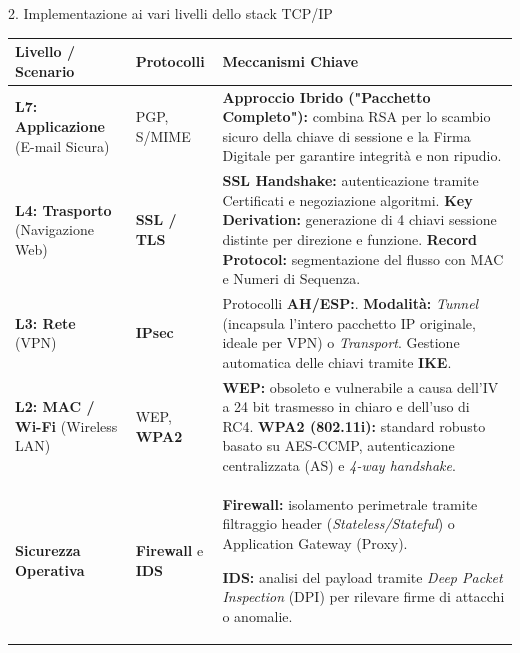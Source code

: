 \documentclass[a4paper,12pt]{report}
\renewcommand{\arraystretch}{1.2} %
\begin{document}
{\begin{notebox}{2. Implementazione ai vari livelli dello stack TCP/IP}
\vspace{0.2cm}
\renewcommand{\arraystretch}{1.4}
\small
\begin{tabularx}{\textwidth}{|l|l|X|}
\toprule
\textbf{Livello / Scenario} & \textbf{Protocolli} & \textbf{Meccanismi Chiave} \\
\midrule
\textbf{L7: Applicazione} \newline (E-mail Sicura) & PGP, \newline S/MIME & \textbf{Approccio Ibrido ("Pacchetto Completo"):} combina RSA per lo scambio sicuro della chiave di sessione e la Firma Digitale per garantire integrità e non ripudio. \\
\hline
\textbf{L4: Trasporto} \newline (Navigazione Web) & \textbf{SSL / TLS} & \textbf{SSL Handshake:} autenticazione tramite Certificati e negoziazione algoritmi. \textbf{Key Derivation:} generazione di 4 chiavi sessione distinte per direzione e funzione. \textbf{Record Protocol:} segmentazione del flusso con MAC e Numeri di Sequenza. \\
\hline
\textbf{L3: Rete} \newline (VPN) & \textbf{IPsec} & Protocolli \textbf{AH/ESP:}. \textbf{Modalità:} \textit{Tunnel} (incapsula l'intero pacchetto IP originale, ideale per VPN) o \textit{Transport}. Gestione automatica delle chiavi tramite \textbf{IKE}. \\
\hline
\textbf{L2: MAC / Wi-Fi} \newline (Wireless LAN) & WEP, \newline \textbf{WPA2} & \textbf{WEP:} obsoleto e vulnerabile a causa dell'IV a 24 bit trasmesso in chiaro e dell'uso di RC4. \textbf{WPA2 (802.11i):} standard robusto basato su AES-CCMP, autenticazione centralizzata (AS) e \textit{4-way handshake}. \\
\hline
\textbf{Sicurezza Operativa}  & \textbf{Firewall} \newline e \textbf{IDS} & \textbf{Firewall:} isolamento perimetrale tramite filtraggio header (\textit{Stateless/Stateful}) o Application Gateway (Proxy). 

\textbf{IDS:} analisi del payload tramite \textit{Deep Packet Inspection} (DPI) per rilevare firme di attacchi o anomalie. \\
\bottomrule
\end{tabularx}


\end{notebox}}
\end{document}

